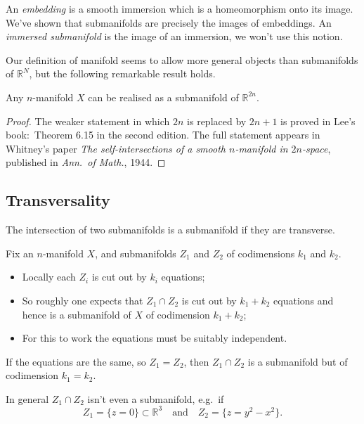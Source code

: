 \documentclass[a4paper,11pt]{article}
\begin{document}
	\begin{defi}
		An \emph{embedding} is a smooth immersion which is a homeomorphism onto its image. We've shown that submanifolds are precisely the images of embeddings. An \emph{immersed submanifold} is the image of an immersion, we won't use this notion.
	\end{defi}

	Our definition of manifold seems to allow more general objects than submanifolds of $\mathbb{R}^N$, but the following remarkable result holds.

	\begin{thm}
		Any $n$-manifold $X$ can be realised as a submanifold of $\mathbb{R}^{2n}$.
	\end{thm}

	\begin{proof}
		The weaker statement in which $2n$ is replaced by $2n + 1$ is proved in Lee's book:\ Theorem 6.15 in the second edition. The full statement appears in Whitney's paper \emph{The self-intersections of a smooth $n$-manifold in $2n$-space}, published in \emph{Ann.\ of Math.}, 1944.
	\end{proof}


	\subsection{Transversality} 

	The intersection of two submanifolds is a submanifold if they are transverse.

	Fix an $n$-manifold $X$, and submanifolds $Z_1$ and $Z_2$ of codimensions $k_1$ and $k_2$.

	\begin{itemize}
		\item Locally each $Z_i$ is cut out by $k_i$ equations;
		\item So roughly one expects that $Z_1 \cap Z_2$ is cut out by $k_1 + k_2$ equations and hence is a submanifold of $X$ of codimension $k_1 + k_2$;
		\item For this to work the equations must be suitably independent.
	\end{itemize}

	\begin{ex}
		If the equations are the same, so $Z_1 = Z_2$, then $Z_1 \cap Z_2$ is a submanifold but of codimension $k_1 = k_2$.
	\end{ex}

	\begin{ex}
		In general $Z_1 \cap Z_2$ isn't even a submanifold, e.g.\ if
		\[
			Z_1 = \{z=0\} \subset \mathbb{R}^3 \quad \text{and} \quad Z_2 = \{z = y^2 - x^2\}.
		\]
	\end{ex}
\end{document}
